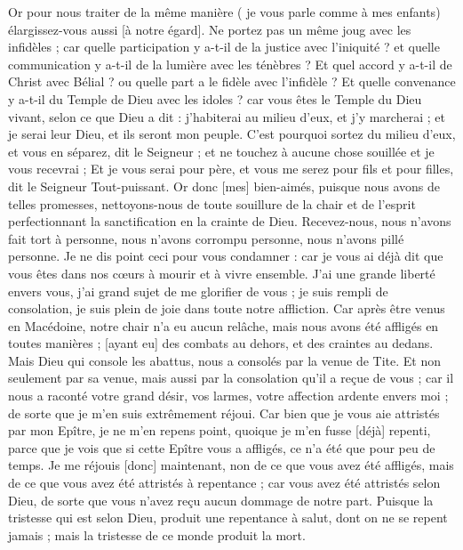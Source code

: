 \begin{multicols}{2}
Or pour nous traiter de la même manière ( je vous parle comme à mes enfants) élargissez-vous aussi [à notre égard].
Ne portez pas un même joug avec les infidèles ; car quelle participation y a-t-il de la justice avec l'iniquité ? et quelle communication y a-t-il de la lumière avec les ténèbres ?
Et quel accord y a-t-il de Christ avec Bélial ? ou quelle part a le fidèle avec l'infidèle ?
Et quelle convenance y a-t-il du Temple de Dieu avec les idoles ? car vous êtes le Temple du Dieu vivant, selon ce que Dieu a dit : j'habiterai au milieu d'eux, et j'y marcherai ; et je serai leur Dieu, et ils seront mon peuple.
C'est pourquoi sortez du milieu d'eux, et vous en séparez, dit le Seigneur ; et ne touchez à aucune chose souillée et je vous recevrai ;
Et je vous serai pour père, et vous me serez pour fils et pour filles, dit le Seigneur Tout-puissant.
\VerseOne{}Or donc [mes] bien-aimés, puisque nous avons de telles promesses, nettoyons-nous de toute souillure de la chair et de l'esprit perfectionnant la sanctification en la crainte de Dieu.
Recevez-nous, nous n'avons fait tort à personne, nous n'avons corrompu personne, nous n'avons pillé personne.
Je ne dis point ceci pour vous condamner : car je vous ai déjà dit que vous êtes dans nos cœurs à mourir et à vivre ensemble.
J'ai une grande liberté envers vous, j'ai grand sujet de me glorifier de vous ; je suis rempli de consolation, je suis plein de joie dans toute notre affliction.
Car après être venus en Macédoine, notre chair n'a eu aucun relâche, mais nous avons été affligés en toutes manières ; [ayant eu] des combats au dehors, et des craintes au dedans.
Mais Dieu qui console les abattus, nous a consolés par la venue de Tite.
Et non seulement par sa venue, mais aussi par la consolation qu'il a reçue de vous ; car il nous a raconté votre grand désir, vos larmes, votre affection ardente envers moi ; de sorte que je m'en suis extrêmement réjoui.
Car bien que je vous aie attristés par mon Epître, je ne m'en repens point, quoique je m'en fusse [déjà] repenti, parce que je vois que si cette Epître vous a affligés, ce n'a été que pour peu de temps.
Je me réjouis [donc] maintenant, non de ce que vous avez été affligés, mais de ce que vous avez été attristés à repentance ; car vous avez été attristés selon Dieu, de sorte que vous n'avez reçu aucun dommage de notre part.
Puisque la tristesse qui est selon Dieu, produit une repentance à salut, dont on ne se repent jamais ; mais la tristesse de ce monde produit la mort.

\end{multicols}
